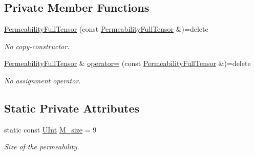 \subsection*{Private Member Functions}
\begin{DoxyCompactItemize}
\item 
\hyperlink{classFVCode3D_1_1PermeabilityFullTensor_a6201aef1ba0ccbff9677eab42a8e847b}{Permeability\+Full\+Tensor} (const \hyperlink{classFVCode3D_1_1PermeabilityFullTensor}{Permeability\+Full\+Tensor} \&)=delete
\begin{DoxyCompactList}\small\item\em No copy-\/constructor. \end{DoxyCompactList}\item 
\hyperlink{classFVCode3D_1_1PermeabilityFullTensor}{Permeability\+Full\+Tensor} \& \hyperlink{classFVCode3D_1_1PermeabilityFullTensor_af7763caf7e668883ca97475bd075f3e4}{operator=} (const \hyperlink{classFVCode3D_1_1PermeabilityFullTensor}{Permeability\+Full\+Tensor} \&)=delete
\begin{DoxyCompactList}\small\item\em No assignment operator. \end{DoxyCompactList}\end{DoxyCompactItemize}
\subsection*{Static Private Attributes}
\begin{DoxyCompactItemize}
\item 
static const \hyperlink{namespaceFVCode3D_a4bf7e328c75d0fd504050d040ebe9eda}{U\+Int} \hyperlink{classFVCode3D_1_1PermeabilityFullTensor_aeced3092b19e53f95a72bdfa6d067518}{M\+\_\+size} = 9
\begin{DoxyCompactList}\small\item\em Size of the permeability. \end{DoxyCompactList}\end{DoxyCompactItemize}
